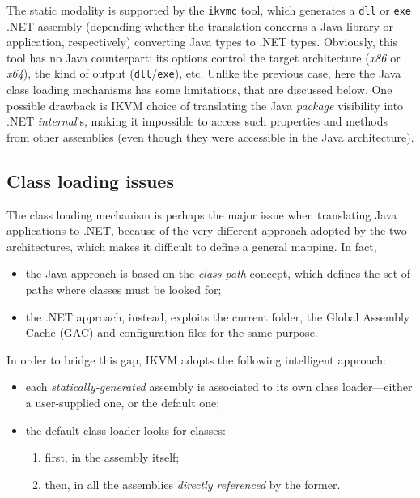 The static modality is supported by the \texttt{ikvmc} tool, which generates a \texttt{dll} or \texttt{exe} .NET assembly (depending whether the translation concerns a Java library or application, respectively) converting Java types to .NET types.
Obviously, this tool has no Java counterpart: its options control the target architecture (\textit{x86} or \textit{x64}), the kind of output (\texttt{dll}/\texttt{exe}), etc.
Unlike the previous case, here the Java class loading mechanisms has some limitations, that are discussed below.
One possible drawback is IKVM choice of translating the Java \textit{package} visibility into .NET \textit{internal}'s, making it impossible to access such properties and methods from other assemblies (even though they were accessible in the Java architecture).

\subsection{Class loading issues}
\label{ssec:ikvm-class-loading}

The class loading mechanism is perhaps the major issue when translating Java applications to .NET, because of the very different approach adopted by the two architectures, which makes it difficult to define a general mapping. In fact,
\begin{itemize}
  \item the Java approach is based on the \textit{class path} concept, which defines the set of paths where classes must be looked for;
  \item the .NET approach, instead, exploits the current folder, the Global Assembly Cache (GAC) and configuration files for the same purpose.
\end{itemize}

\noindent In order to bridge this gap, IKVM adopts the following intelligent approach:
\begin{itemize}
  \item each \textit{statically-generated} assembly is associated to its own class loader---either a user-supplied one, or the default one;

  \item the default class loader looks for classes:
  \begin{enumerate}
    \item first, in the assembly itself;
    \item then, in all the assemblies \textit{directly referenced} by the former.
  \end{enumerate}
\end{itemize}

